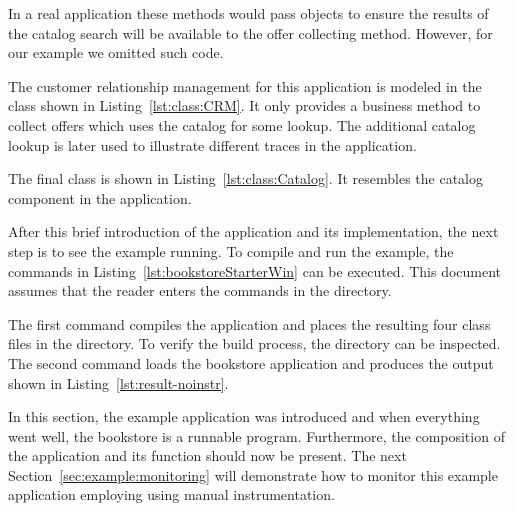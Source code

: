 In a real application these methods would pass objects to ensure the results of the catalog search will be available to the offer collecting method. However, for our example we omitted such code. 



\noindent The customer relationship management for this application is modeled in the  class shown in Listing~\ref{lst:class:CRM}. It only provides a business method to collect offers which uses the catalog for some lookup. The additional catalog lookup is later used to illustrate different traces in the application.



\noindent The final class is  shown in Listing~\ref{lst:class:Catalog}. It resembles the catalog component in the application.



\noindent After this brief introduction of the application and its implementation, the next step is to see the example running. To compile and run the example, the commands in Listing~\ref{lst:bookstoreStarterWin} can be executed. This document assumes that the reader enters the commands in the  directory.

\setBashListing
% 
%

\noindent The first command compiles the application and places the resulting four class files in the  directory. To verify the build process, the  directory can be inspected. The second command loads the bookstore application and produces the output shown in Listing~\ref{lst:result-noinstr}.



\noindent In this section, the \Kieker{} example application was introduced and when everything went well, the bookstore is a runnable program. Furthermore, the composition of the application and its function should now be present. %
The next Section~\ref{sec:example:monitoring} will demonstrate how %
to monitor this example application employing \KiekerMonitoringPart{} using manual instrumentation.

